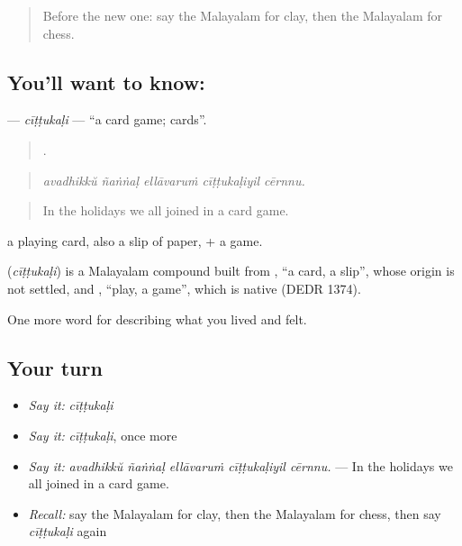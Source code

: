 \label{lesson:ML-C566-cittukali}



\begin{quote}
Before the new one: say the Malayalam for clay, then the Malayalam for chess.
\end{quote}

\subsection*{You'll want to know: }
\textbf{} — \emph{cīṭṭukaḷi} — \textquotedblleft{}a card game; cards\textquotedblright{}.

\begin{quote}
    .
\end{quote}

\begin{quote}
\emph{avadhikkŭ ñaṅṅaḷ ellāvaruṁ cīṭṭukaḷiyil cērnnu.}
\end{quote}

\begin{quote}
In the holidays we all joined in a card game.
\end{quote}

 a playing card, also a slip of paper, +  a game.

\begin{cousinweb}
\textbf{} (\emph{cīṭṭukaḷi}) is a Malayalam compound built from , \textquotedblleft{}a card, a slip\textquotedblright{}, whose origin is not settled, and , \textquotedblleft{}play, a game\textquotedblright{}, which is native (DEDR 1374).
\end{cousinweb}

\begin{grammarlens}[title={What you've built}]
One more word for describing what you lived and felt.
\end{grammarlens}

\subsection*{Your turn}
\begin{itemize}
\raggedright
  \item \emph{Say it:} \emph{cīṭṭukaḷi}
  \item \emph{Say it:} \emph{cīṭṭukaḷi}, once more
  \item \emph{Say it:} \emph{avadhikkŭ ñaṅṅaḷ ellāvaruṁ cīṭṭukaḷiyil cērnnu.} — In the holidays we all joined in a card game.
  \item \emph{Recall:} say the Malayalam for clay, then the Malayalam for chess, then say \emph{cīṭṭukaḷi} again
\end{itemize}

